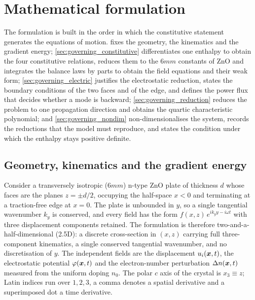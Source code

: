 \section{Mathematical formulation}
\label{sec:governing}

The formulation is built in the order in which the constitutive statement
generates the equations of motion.   fixes the
geometry, the kinematics and the gradient energy; \cref{sec:governing_constitutive}
differentiates one enthalpy to obtain the four constitutive relations, reduces
them to the $6mm$ constants of ZnO and integrates the balance laws by parts to
obtain the field equations and their weak form;
\cref{sec:governing_electric} justifies the electrostatic reduction, states the
boundary conditions of the two faces and of the edge, and defines the power flux
that decides whether a mode is backward;
\cref{sec:governing_reduction} reduces the problem to one propagation direction
and obtains the quartic characteristic polynomial; and
\cref{sec:governing_nondim} non-dimensionalises the system, records the
reductions that the model must reproduce, and states the condition under which
the enthalpy stays positive definite.

\subsection{Geometry, kinematics and the gradient energy}
\label{sec:governing_variational}
\label{sec:governing_kinematics}

Consider a transversely isotropic ($6mm$) n-type ZnO plate of thickness $d$
whose faces are the planes $z=\pm d/2$, occupying the half-space $x<0$ and
terminating at a traction-free edge at $x=0$.  The plate is unbounded in $y$, so
a single tangential wavenumber $k_y$ is conserved, and every field has the form
$f(x,z)\,e^{ik_yy-i\omega t}$ with three displacement components retained.  The
formulation is therefore two-and-a-half-dimensional (2.5D): a discrete
cross-section in $(x,z)$ carrying full three-component kinematics, a single
conserved tangential wavenumber, and no discretisation of $y$.  The independent fields are
the displacement $u_i(\boldsymbol{x},t)$, the electrostatic potential
$\varphi(\boldsymbol{x},t)$ and the electron-number perturbation
$\Delta n(\boldsymbol{x},t)$ measured from the uniform doping $n_0$.  The polar $c$
axis of the crystal is $x_3\equiv z$; Latin indices run over $1,2,3$, a comma
denotes a spatial derivative and a superimposed dot a time derivative.

